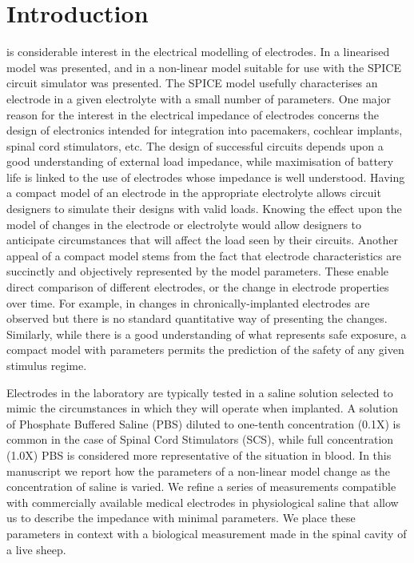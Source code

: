 \documentclass[journal, a4paper]{IEEEtran}
\begin{document}
\section{Introduction}
 is considerable interest in the electrical modelling of electrodes. \cite{Cogan2008,Troy2006}
In \cite{Franks2005} a linearised model was presented, and in \cite{ScottSingle2013} a non-linear model
suitable for use with the SPICE circuit simulator was presented. The SPICE model usefully characterises an electrode in a given electrolyte with a small number of parameters.
One major reason for the interest in the electrical impedance of electrodes concerns the design of electronics intended for integration into pacemakers, cochlear implants, spinal cord stimulators, etc. The design of successful circuits depends upon a good understanding of external load impedance, while maximisation of battery life is linked to the use of electrodes whose impedance is well understood.
Having a compact model of an electrode in the appropriate electrolyte allows circuit designers to simulate their designs with valid loads. Knowing the effect upon the model of changes in the electrode or electrolyte would allow designers to anticipate circumstances that will affect the load seen by their circuits. Another appeal of a compact model stems from the fact that electrode characteristics are succinctly and objectively represented by the model parameters. These enable direct comparison of different electrodes, or the change in electrode properties over time. For example, in \cite{Kane13} changes in chronically-implanted electrodes are observed but there is no standard quantitative way of presenting the changes. Similarly, while there is a good understanding of what represents safe exposure, a compact model with parameters permits the prediction of the safety of any given stimulus regime.~\cite{Merrill05}

Electrodes in the laboratory are typically tested in a saline solution selected to mimic the circumstances in which they will operate when implanted.
{
    \color{blue}
A solution of Phosphate Buffered Saline (PBS) diluted to one-tenth concentration (0.1X) is common in the case of Spinal Cord Stimulators (SCS), while full concentration (1.0X) PBS is considered more representative of the situation in blood.
}
In this manuscript we report how the parameters of a non-linear model change as the concentration of saline is varied. {\color{blue} We refine a series of measurements compatible with commercially available medical electrodes in physiological saline that allow us to describe the impedance with minimal parameters.} We place these parameters in context with a biological measurement made in the spinal cavity of a live sheep.
\end{document}
